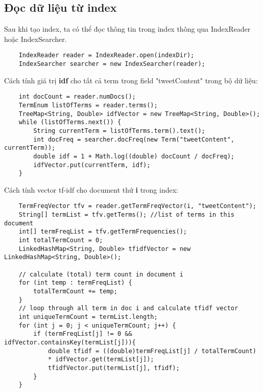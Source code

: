 	\subsection*{Đọc dữ liệu từ index}
	Sau khi tạo index, ta có thể đọc thông tin trong index thông qua IndexReader hoặc IndexSearcher. 
		\begin{lstlisting}
	IndexReader reader = IndexReader.open(indexDir);
	IndexSearcher searcher = new IndexSearcher(reader);
		\end{lstlisting}
	
	Cách tính giá trị \textbf{idf} cho tất cả term trong field "tweetContent" trong bộ dữ liệu:
		\begin{lstlisting}	
	int docCount = reader.numDocs();
	TermEnum listOfTerms = reader.terms();
	TreeMap<String, Double> idfVector = new TreeMap<String, Double>();
	while (listOfTerms.next()) {
		String currentTerm = listOfTerms.term().text();
		int docFreq = searcher.docFreq(new Term("tweetContent", currentTerm));
		double idf = 1 + Math.log((double) docCount / docFreq);
		idfVector.put(currentTerm, idf);
	}
		\end{lstlisting}

	Cách tính vector tf-idf cho document thứ \textbf{i} trong index:	
		\begin{lstlisting}
	TermFreqVector tfv = reader.getTermFreqVector(i, "tweetContent");
	String[] termList = tfv.getTerms(); //list of terms in this document
	int[] termFreqList = tfv.getTermFrequencies();
	int totalTermCount = 0;
	LinkedHashMap<String, Double> tfidfVector = new LinkedHashMap<String, Double>();
	
	// calculate (total) term count in document i
	for (int temp : termFreqList) {
		totalTermCount += temp;
	}
	// loop through all term in doc i and calculate tfidf vector
	int uniqueTermCount = termList.length;
	for (int j = 0; j < uniqueTermCount; j++) {				
		if (termFreqList[j] != 0 && idfVector.containsKey(termList[j])){
			double tfidf = ((double)termFreqList[j] / totalTermCount)
			* idfVector.get(termList[j]);
			tfidfVector.put(termList[j], tfidf);
		}
	}
		\end{lstlisting}
		